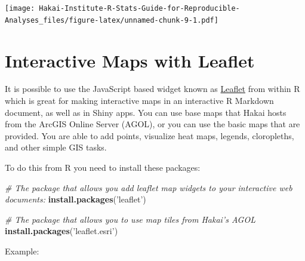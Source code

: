 \documentclass[]{book}
\newenvironment{Shaded}{\begin{snugshade}}{\end{snugshade}}
\newcommand{\KeywordTok}[1]{\textcolor[rgb]{0.13,0.29,0.53}{\textbf{#1}}}
\newcommand{\DataTypeTok}[1]{\textcolor[rgb]{0.13,0.29,0.53}{#1}}
\newcommand{\DecValTok}[1]{\textcolor[rgb]{0.00,0.00,0.81}{#1}}
\newcommand{\FloatTok}[1]{\textcolor[rgb]{0.00,0.00,0.81}{#1}}
\newcommand{\StringTok}[1]{\textcolor[rgb]{0.31,0.60,0.02}{#1}}
\newcommand{\CommentTok}[1]{\textcolor[rgb]{0.56,0.35,0.01}{\textit{#1}}}
\newcommand{\OperatorTok}[1]{\textcolor[rgb]{0.81,0.36,0.00}{\textbf{#1}}}
\newcommand{\NormalTok}[1]{#1}
\begin{document}
\texttt{[image: Hakai-Institute-R-Stats-Guide-for-Reproducible-Analyses\_files/figure-latex/unnamed-chunk-9-1.pdf]}

\section{Interactive Maps with
Leaflet}\label{interactive-maps-with-leaflet}

It is possible to use the JavaScript based widget known as
\href{https://rstudio.github.io/leaflet/}{Leaflet} from within R which
is great for making interactive maps in an interactive R Markdown
document, as well as in Shiny apps. You can use base maps that Hakai
hosts from the ArcGIS Online Server (AGOL), or you can use the basic
maps that are provided. You are able to add points, visualize heat maps,
legends, cloropleths, and other simple GIS tasks.

To do this from R you need to install these packages:

\begin{Shaded}
\begin{Highlighting}[]
\CommentTok{# The package that allows you add leaflet map widgets to your interactive web documents:}
\KeywordTok{install.packages}\NormalTok{(}\StringTok{'leaflet'}\NormalTok{)}

\CommentTok{# The package that allows you to use map tiles from Hakai's AGOL}
\KeywordTok{install.packages}\NormalTok{(}\StringTok{'leaflet.esri'}\NormalTok{)}
\end{Highlighting}
\end{Shaded}

Example:

\begin{Shaded}
\end{Shaded}
\end{document}
